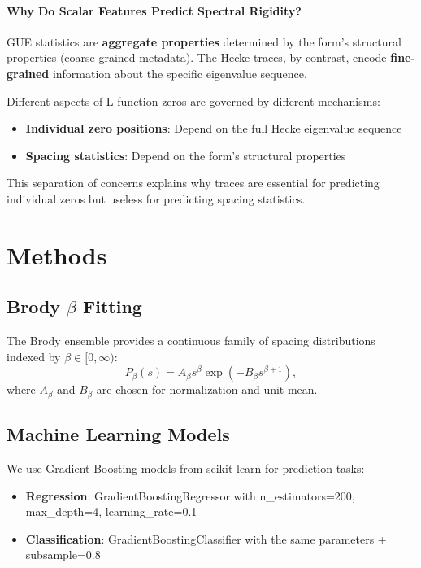 \documentclass[11pt, a4paper]{article}
\newcommand{\GUE}{\textsc{GUE}}
\begin{document}
\paragraph{Why Do Scalar Features Predict Spectral Rigidity?} \GUE{} statistics are \textbf{aggregate properties} determined by the form's structural properties (coarse-grained metadata). The Hecke traces, by contrast, encode {\bfseries fine-grained} information about the specific eigenvalue sequence.

Different aspects of L-function zeros are governed by different mechanisms:
\begin{itemize}
\item {\bfseries Individual zero positions}: Depend on the full Hecke eigenvalue sequence
\item {\bfseries Spacing statistics}: Depend on the form's structural properties
\end{itemize}

This separation of concerns explains why traces are essential for predicting individual zeros but useless for predicting spacing statistics.

\section{Methods}
\label{sec:methods}

\subsection{Brody $\beta$ Fitting}

The Brody ensemble provides a continuous family of spacing distributions indexed by $\beta \in [0, \infty)$:
\begin{equation}\label{eq:brody_full}
P_\beta(s) = A_\beta s^\beta \exp(-B_\beta s^{\beta+1}),
\end{equation}
where $A_\beta$ and $B_\beta$ are chosen for normalization and unit mean.

\subsection{Machine Learning Models}

We use Gradient Boosting models from scikit-learn for prediction tasks:
\begin{itemize}
\item {\bfseries Regression}: GradientBoostingRegressor with n\_estimators=200, max\_depth=4, learning\_rate=0.1
\item {\bfseries Classification}: GradientBoostingClassifier with the same parameters + subsample=0.8
\end{itemize}
\end{document}
